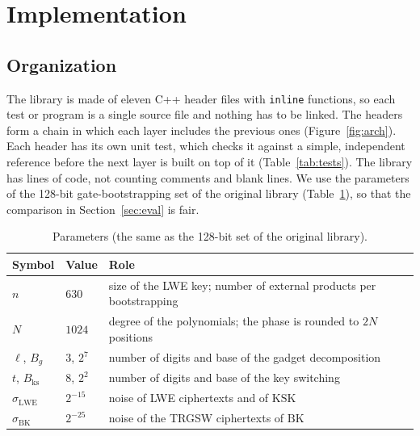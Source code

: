 \documentclass[12pt]{article}
\theoremstyle{plain}
\theoremstyle{definition}
\newcommand{\Bg}{B_g}
\newcommand{\Bks}{B_{\mathrm{ks}}}
\newcommand{\BK}{\mathrm{BK}}
\newcommand{\KSK}{\mathrm{KSK}}
\newcommand{\code}[1]{\texttt{#1}}
\begin{document}
\section{Implementation}
\label{sec:impl}

\subsection{Organization}

The library is made of eleven C++ header files with \code{inline} functions, so
each test or program is a single source file and nothing has to be linked.
The headers form a chain in which each layer includes the previous ones
(Figure~\ref{fig:arch}). Each header has its own unit test, which checks it
against a simple, independent reference before the next layer is built on top
of it (Table~\ref{tab:tests}). The library has \LibLines{} lines of code, not
counting comments and blank lines. We use the parameters of the 128-bit
gate-bootstrapping set of the original library (Table~\ref{tab:params}), so
that the comparison in Section~\ref{sec:eval} is fair.



\begin{table}[!htb]
\centering
\caption{Parameters (the same as the 128-bit set of the original library).}
\label{tab:params}
\small
\begin{tabular}{@{}lll@{}}
\toprule
Symbol & Value & Role\\
\midrule
$n$ & $630$ & size of the LWE key; number of external products per bootstrapping\\
$N$ & $1024$ & degree of the polynomials; the phase is rounded to $2N$ positions\\
$\ell$, $\Bg$ & $3$, $2^7$ & number of digits and base of the gadget decomposition\\
$t$, $\Bks$ & $8$, $2^2$ & number of digits and base of the key switching\\
$\sigma_{\mathrm{LWE}}$ & $2^{-15}$ & noise of LWE ciphertexts and of $\KSK$\\
$\sigma_{\BK}$ & $2^{-25}$ & noise of the TRGSW ciphertexts of $\BK$\\
\bottomrule
\end{tabular}
\end{table}
\end{document}
